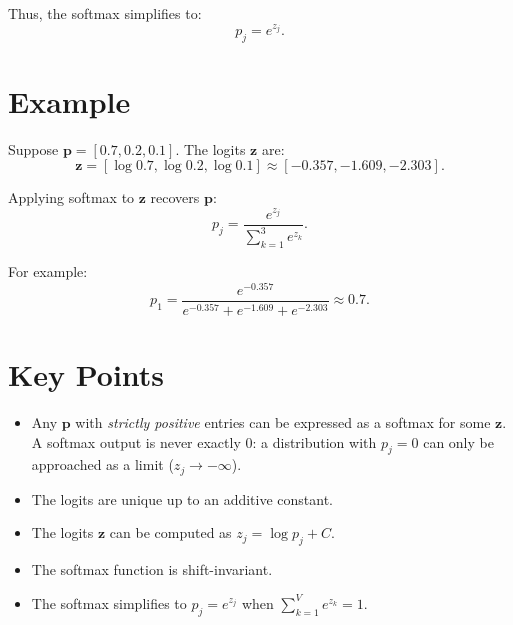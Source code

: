 \begin{notechapter}
Thus, the softmax simplifies to:
\[
p_j = e^{z_j}.
\]

\section{Example}
Suppose \( \mathbf{p} = [0.7, 0.2, 0.1] \). The logits \( \mathbf{z} \) are:
\[
\mathbf{z} = [\log 0.7, \log 0.2, \log 0.1] \approx [-0.357, -1.609, -2.303].
\]

Applying softmax to \( \mathbf{z} \) recovers \( \mathbf{p} \):
\[
p_j = \frac{e^{z_j}}{\sum_{k=1}^3 e^{z_k}}.
\]

For example:
\[
p_1 = \frac{e^{-0.357}}{e^{-0.357} + e^{-1.609} + e^{-2.303}} \approx 0.7.
\]

\section{Key Points}
\begin{itemize}
    \item Any \( \mathbf{p} \) with \emph{strictly positive} entries can be expressed as a softmax for some \( \mathbf{z} \). A softmax output is never exactly \( 0 \): a distribution with \( p_j = 0 \) can only be approached as a limit (\( z_j \to -\infty \)).
  \item The logits are unique up to an additive constant.
  \item The logits \( \mathbf{z} \) can be computed as \( z_j = \log p_j + C \).
  \item The softmax function is shift-invariant.
  \item The softmax simplifies to \( p_j = e^{z_j} \) when \( \sum_{k=1}^V e^{z_k} = 1 \).
\end{itemize}
\end{notechapter}
